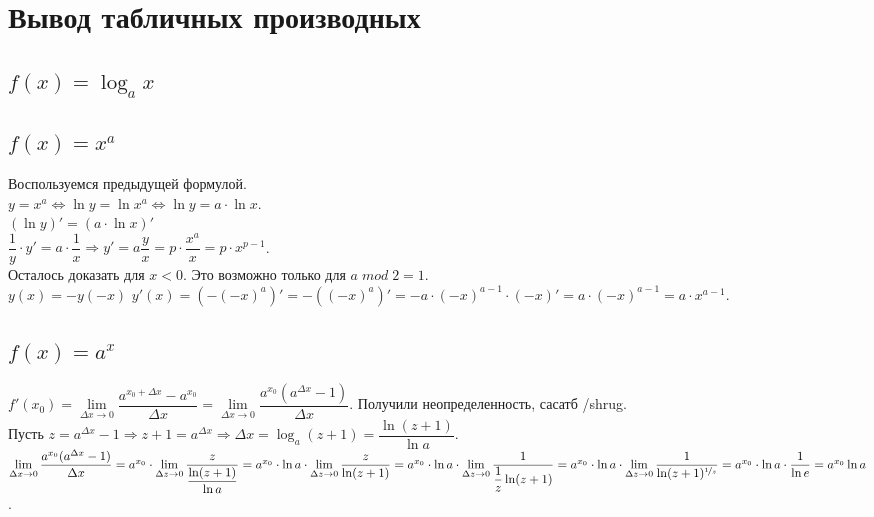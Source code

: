 \documentclass{article}
\begin{document}
\bigskip\bigskip
\section{Вывод табличных производных}
 
\subsection{$f(x) = \log_a x$}
\subsection{$f(x) = x^a$}
Воспользуемся предыдущей формулой. \\
$y = x^a \Leftrightarrow \ln y = \ln x^a \Leftrightarrow \ln y = a\cdot\ln x$. \\
$(\ln y)' = (a\cdot\ln x)'$ \\
$\dfrac{1}{y}\cdot y' = a\cdot\dfrac{1}{x} \Rightarrow y' = a\dfrac{y}{x} = p\cdot\dfrac{x^a}{x} = p\cdot x^{p - 1}$.\\
Осталось доказать для $x < 0$. Это возможно только для $a\; mod\; 2 = 1$. \\
$y(x) = -y(-x)$
$y'(x) = (-(-x)^a)' = -((-x)^a)' = -a\cdot (-x)^{a - 1}\cdot (-x)' = a\cdot(-x)^{a - 1} = a\cdot x^{a - 1}$.
 
\subsection{$f(x) = a^x$}
$f'(x_0) = \lim\limits_{\Delta x\to 0}\dfrac{a^{x_0 + \Delta x} - a^{x_0}}{\Delta x} = \lim\limits_{\Delta x\to 0}\dfrac{a^{x_0}(a^{\Delta x} - 1)}{\Delta x}$. Получили неопределенность, сасатб /shrug. \\
Пусть $z = a^{\Delta x} - 1 \Rightarrow z + 1 = a^{\Delta x} \Rightarrow \Delta x = \log_a (z + 1) = \dfrac{\ln(z + 1)}{\ln a}$. \\
$\lim\limits_{\Delta x\to 0}\dfrac{a^{x_0}(a^{\Delta x} - 1)}{\Delta x} = a^{x_0}\cdot\lim\limits_{\Delta z\to 0}\dfrac{z}{\dfrac{\ln(z + 1)}{\ln a}} = a^{x_0}\cdot\ln a\cdot\lim\limits_{\Delta z\to 0}\dfrac{z}{\ln(z + 1)} = a^{x_0}\cdot\ln a\cdot\lim\limits_{\Delta z\to 0}\dfrac{1}{\dfrac{1}{z}\ln(z + 1)} = a^{x_0}\cdot\ln a\cdot\lim\limits_{\Delta z\to 0}\dfrac{1}{\ln(z + 1)^{\nicefrac{1}{z}}} = a^{x_0}\cdot\ln a\cdot\dfrac{1}{\ln e} = a^{x_0}\ln a$.\\ \\ \\
\end{document}
